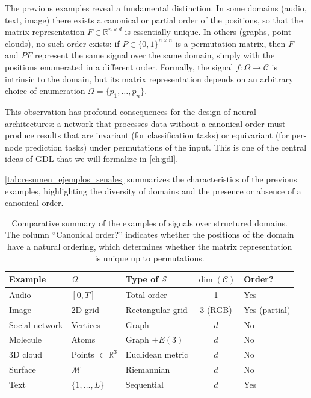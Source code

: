 \begin{remark}\label{rem:invarianza_permutacion}
The previous examples reveal a fundamental distinction. In some domains (audio, text, image) there exists a canonical or partial order of the positions, so that the matrix representation $F \in \mathbb{R}^{n \times d}$ is essentially unique. In others (graphs, point clouds), no such order exists: if $P \in \{0,1\}^{n \times n}$ is a permutation matrix, then $F$ and $PF$ represent the same signal over the same domain, simply with the positions enumerated in a different order. Formally, the signal $f: \Omega \to \mathcal{C}$ is intrinsic to the domain, but its matrix representation depends on an arbitrary choice of enumeration $\Omega = \{p_1, \ldots, p_n\}$.

This observation has profound consequences for the design of neural architectures: a network that processes data without a canonical order must produce results that are invariant (for classification tasks) or equivariant (for per-node prediction tasks) under permutations of the input. This is one of the central ideas of \gls{GDL} that we will formalize in \autoref{ch:gdl}.
\end{remark}

\autoref{tab:resumen_ejemplos_senales} summarizes the characteristics of the previous examples, highlighting the diversity of domains and the presence or absence of a canonical order.

\begin{table}[htbp]
\centering
\caption[Summary of examples of signals over structured domains]{Comparative summary of the examples of signals over structured domains. The column ``Canonical order?'' indicates whether the positions of the domain have a natural ordering, which determines whether the matrix representation is unique up to permutations.}
\label{tab:resumen_ejemplos_senales}
\begin{tabular}{lllcl}
\toprule
\textbf{Example} & $\Omega$ & \textbf{Type of} $\mathcal{S}$ & $\dim(\mathcal{C})$ & \textbf{Order?} \\
\midrule
Audio & $[0,T]$ & Total order & 1 & Yes \\
Image & 2D grid & Rectangular grid & 3 (RGB) & Yes (partial) \\
Social network & Vertices & Graph & $d$ & No \\
Molecule & Atoms & Graph $+ E(3)$ & $d$ & No \\
3D cloud & Points $\subset \mathbb{R}^3$ & Euclidean metric & $d$ & No \\
Surface & $\mathcal{M}$ & Riemannian & $d$ & No \\
Text & $\{1,\ldots,L\}$ & Sequential & $d$ & Yes \\
\bottomrule
\end{tabular}
\end{table}

